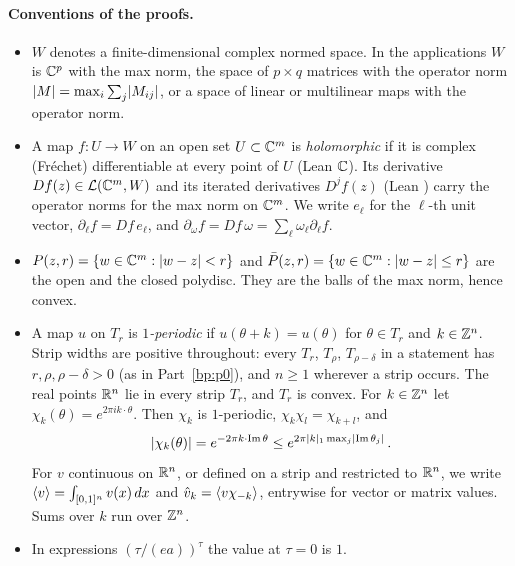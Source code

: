 \paragraph{Conventions of the proofs.}
\begin{itemize}
\item $W$ denotes a finite-dimensional complex normed space. In the applications $W$ is $\mathbb{C}^p$ with the
  max norm, the space of $p\times q$ matrices with the operator norm $\lvert M\rvert=\max_i\sum_j\lvert M_{ij}\rvert$,
  or a space of linear or multilinear maps with the operator norm.
\item A map $f:U\to W$ on an open set $U\subset\mathbb{C}^m$ is \emph{holomorphic} if it is complex (Fr\'echet)
  differentiable at every point of $U$ (Lean  $\mathbb{C}$). Its derivative
  $Df(z)\in\mathcal L(\mathbb{C}^m,W)$ and its iterated derivatives $D^jf(z)$ (Lean )
  carry the operator norms for the max norm on $\mathbb{C}^m$. We write $e_\ell$ for the $\ell$-th unit vector,
  $\partial_\ell f=Df\,e_\ell$, and $\partial_\omega f=Df\,\omega=\sum_\ell\omega_\ell\partial_\ell f$.
\item $P(z,r)=\{w\in\mathbb{C}^m:\lvert w-z\rvert<r\}$ and $\bar P(z,r)=\{w\in\mathbb{C}^m:\lvert w-z\rvert\le r\}$ are the open and the
  closed polydisc. They are the balls of the max norm, hence convex.
\item A map $u$ on $T_r$ is \emph{$1$-periodic} if $u(\theta+k)=u(\theta)$ for $\theta\in T_r$ and
  $k\in\mathbb{Z}^n$. Strip widths are positive throughout: every $T_r$, $T_\rho$, $T_{\rho-\delta}$ in a statement
  has $r,\rho,\rho-\delta>0$ (as in Part~\ref{bp:p0}), and $n\ge1$ wherever a strip occurs. The real points
  $\mathbb{R}^n$ lie in every strip $T_r$, and $T_r$ is convex. For
  $k\in\mathbb{Z}^n$ let $\chi_k(\theta)=e^{2\pi ik\cdot\theta}$. Then $\chi_k$ is $1$-periodic,
  $\chi_k\chi_l=\chi_{k+l}$, and
  \begin{equation*}
  \lvert \chi_k(\theta)\rvert=e^{-2\pi k\cdot\operatorname{Im}\theta}\le
  e^{2\pi\lvert k\rvert_1\max_j\lvert \operatorname{Im}\theta_j\rvert}\,.
  \end{equation*}
  For $v$ continuous on $\mathbb{R}^n$, or defined on a strip and restricted to $\mathbb{R}^n$, we write
  $\langle v\rangle=\int_{[0,1]^n}v(x)\,dx$ and $\hat v_k=\langle v\chi_{-k}\rangle$, entrywise for vector or matrix
  values. Sums over $k$ run over $\mathbb{Z}^n$.
\item In expressions $(\tau/(ea))^\tau$ the value at $\tau=0$ is $1$.
\end{itemize}

